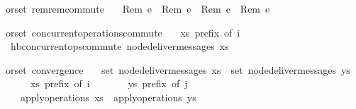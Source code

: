 \begin{isabellebody}
\isamarkupfalse%
\ {\isacharparenleft}\ orset{\isacharparenright}\ rem{\isacharunderscore}rem{\isacharunderscore}commute{\isacharcolon}\isanewline
\ \ \ {\isachardoublequoteopen}{\isasymlangle}Rem\ e{}{\isasymrangle}\ {\isasymrhd}\ {\isasymlangle}Rem\ e{}{\isasymrangle}\ {\isacharequal}\ {\isasymlangle}Rem\ e{}{\isasymrangle}\ {\isasymrhd}\ {\isasymlangle}Rem\ e{}{\isasymrangle}{\isachardoublequoteclose}
\end{isabellebody}

\begin{isabellebody}
\isamarkupfalse%
\ {\isacharparenleft}\ orset{\isacharparenright}\ concurrent{\isacharunderscore}operations{\isacharunderscore}commute{\isacharcolon}\isanewline
\ \ \ {\isachardoublequoteopen}xs\ prefix\ of\ i{\isachardoublequoteclose}\isanewline
\ \ \ {\isachardoublequoteopen}hb{\isachardot}concurrent{\isacharunderscore}ops{\isacharunderscore}commute\ {\isacharparenleft}node{\isacharunderscore}deliver{\isacharunderscore}messages\ xs{\isacharparenright}{\isachardoublequoteclose}
\end{isabellebody}

\begin{isabellebody}
\isamarkupfalse%
\ {\isacharparenleft}\ orset{\isacharparenright}\ convergence{\isacharcolon}\isanewline
\ \ \ {\isachardoublequoteopen}set\ {\isacharparenleft}node{\isacharunderscore}deliver{\isacharunderscore}messages\ xs{\isacharparenright}\ {\isacharequal}\ set\ {\isacharparenleft}node{\isacharunderscore}deliver{\isacharunderscore}messages\ ys{\isacharparenright}{\isachardoublequoteclose}\isanewline
\ \ \ \ \ \ \ {\isachardoublequoteopen}xs\ prefix\ of\ i{\isachardoublequoteclose}\isanewline
\ \ \ \ \ \ \ {\isachardoublequoteopen}ys\ prefix\ of\ j{\isachardoublequoteclose}\isanewline
\ \ \ \ \ {\isachardoublequoteopen}apply{\isacharunderscore}operations\ xs\ {\isacharequal}\ apply{\isacharunderscore}operations\ ys{\isachardoublequoteclose}\isanewline
\end{isabellebody}